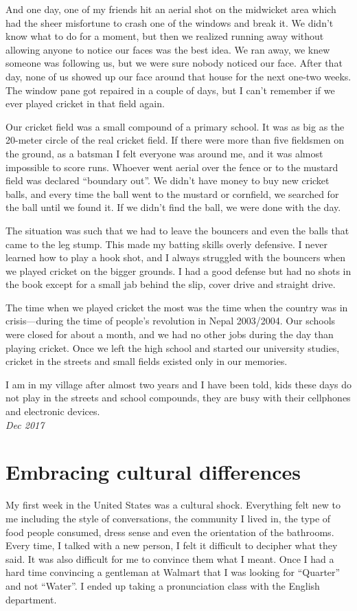 \documentclass[oneside,12pt]{book}
\begin{document}
And one day, one of my friends hit an aerial shot on the midwicket area which had the sheer misfortune to crash one of the windows and break it. We didn’t know what to do for a moment, but then we realized running away without allowing anyone to notice our faces was the best idea. We ran away, we knew someone was following us, but we were sure nobody noticed our face. After that day, none of us showed up our face around that house for the next one-two weeks. The window pane got repaired in a couple of days, but I can’t remember if we ever played cricket in that field again. 

Our cricket field was a small compound of a primary school. It was as big as the 20-meter circle of the real cricket field. If there were more than five fieldsmen on the ground, as a batsman I felt everyone was around me, and it was almost impossible to score runs. Whoever went aerial over the fence or to the mustard field was declared “boundary out”.  We didn’t have money to buy new cricket balls, and every time the ball went to the mustard or cornfield, we searched for the ball until we found it. If we didn’t find the ball, we were done with the day. 

The situation was such that we had to leave the bouncers and even the balls that came to the leg stump. This made my batting skills overly defensive. I never learned how to play a hook shot, and I always struggled with the bouncers when we played cricket on the bigger grounds. I had a good defense but had no shots in the book except for a small jab behind the slip, cover drive and straight drive. 

The time when we played cricket the most was the time when the country was in crisis—during the time of people’s revolution in Nepal 2003/2004. Our schools were closed for about a month, and we had no other jobs during the day than playing cricket. Once we left the high school and started our university studies, cricket in the streets and small fields existed only in our memories. 

I am in my village after almost two years and I have been told, kids these days do not play in the streets and school compounds, they are busy with their cellphones and electronic devices. \\

\textit{Dec 2017}\\

\section*{Embracing cultural differences}
My first week in the United States was a cultural shock. Everything felt new to me including the style of conversations, the community I lived in, the type of food people consumed, dress sense and even the orientation of the bathrooms. Every time, I talked with a new person, I felt it difficult to decipher what they said. It was also difficult for me to convince them what I meant. Once I had a hard time convincing a gentleman at Walmart that I was looking for “Quarter” and not “Water”. I ended up taking a pronunciation class with the English department. 
\end{document}

